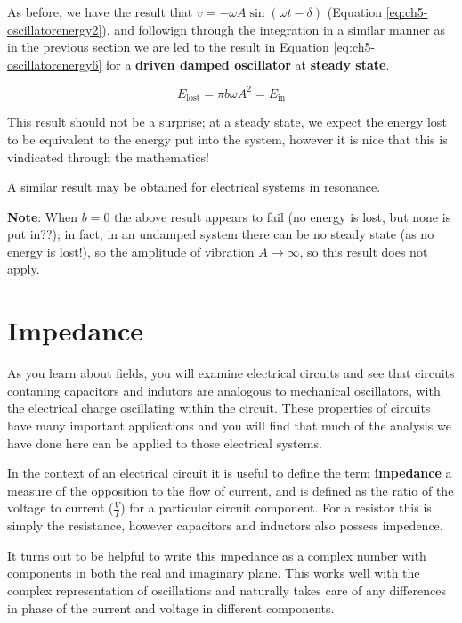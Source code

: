 \documentclass[
]{book}
\begin{document}
As before, we have the result that \(v = -\omega A \sin(\omega t - \delta)\) (Equation \eqref{eq:ch5-oscillatorenergy2}), and followign through the integration in a similar manner as in the previous section we are led to the result in Equation \eqref{eq:ch5-oscillatorenergy6} for a \textbf{driven damped oscillator} at \textbf{steady state}.

\begin{equation}
E_{\mathrm{lost}}  = \pi b \omega A^2= E_{\mathrm{in}}
\label{eq:ch5-oscillatorenergy6}
\end{equation}

This result should not be a surprise; at a steady state, we expect the energy lost to be equivalent to the energy put into the system, however it is nice that this is vindicated through the mathematics!

A similar result may be obtained for electrical systems in resonance.

\textbf{Note}: When \(b = 0\) the above result appears to fail (no energy is lost, but none is put in??); in fact, in an undamped system there can be no steady state (as no energy is lost!), so the amplitude of vibration \(A \rightarrow \infty\), so this result does not apply.

\hypertarget{sec:ch5-impedance}{%
\section{Impedance}\label{sec:ch5-impedance}}

As you learn about fields, you will examine electrical circuits and see that circuits contaning capacitors and indutors are analogous to mechanical oscillators, with the electrical charge oscillating within the circuit. These properties of circuits have many important applications and you will find that much of the analysis we have done here can be applied to those electrical systems.

In the context of an electrical circuit it is useful to define the term \textbf{impedance} a measure of the opposition to the flow of current, and is defined as the ratio of the voltage to current (\(\frac{V}{I}\)) for a particular circuit component. For a resistor this is simply the resistance, however capacitors and inductors also possess impedence.

It turns out to be helpful to write this impedance as a complex number with components in both the real and imaginary plane. This works well with the complex representation of oscillations and naturally takes care of any differences in phase of the current and voltage in different components.
\end{document}
